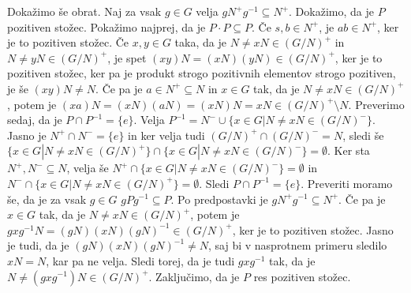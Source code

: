 \documentclass[a4paper, 12pt]{article}
\begin{document}
Dokažimo še obrat. Naj za vsak $g\in G$ velja $g N^+ g^{-1} \subseteq N^+$. Dokažimo, da je $P$ pozitiven stožec. Pokažimo najprej, da je $P\cdot P \subseteq P$. Če $s,b\in N^+$, je $ab \in N^+$, ker je to pozitiven stožec. Če $x,y\in G$ taka, da je $N\neq xN \in (G/N)^+$ in $N \neq yN \in (G/N)^+$, je spet $(xy)N = (xN) (yN)\in (G/N)^+$, ker je to pozitiven stožec, ker pa je produkt strogo pozitivnih elementov strogo pozitiven, je še $(xy)N \neq N$. Če pa je $a\in N^+\subseteq N$ in $x\in G$ tak, da je $N\neq xN \in (G/N)^+$, potem je $(xa)N = (xN) (aN) = (xN)N = xN\in (G/N)^+ \setminus N$. Preverimo sedaj, da je $P\cap P^{-1} = \{e\}$. Velja $P^{-1} = N^- \cup \{ x\in G| N \neq xN \in (G/N)^-\}$. Jasno je $N^+ \cap N^- = \{e\}$ in ker velja tudi $(G/N)^+ \cap (G/N)^- = N$, sledi še $\{x\in G| N \neq xN \in (G/N)^+\} \cap \{x\in G| N \neq xN \in (G/N)^-\} = \emptyset$. Ker sta $N^+, N^- \subseteq  N$, velja še $N^+ \cap \{x\in G|  N \neq xN \in (G/N)^-\} = \emptyset$ in $N^- \cap \{x\in G|  N \neq xN \in (G/N)^+\} = \emptyset$. Sledi $P\cap P^{-1} = \{e\}$. Preveriti moramo še, da je za vsak $g\in G$ $gPg^{-1} \subseteq P$. Po predpostavki je $gN^+ g^{-1} \subseteq N^+$. Če pa je $x\in G$ tak, da je $N\neq xN \in (G/N)^+$, potem je $gxg^{-1} N = (gN) (xN) (gN)^{-1} \in (G/N)^+$, ker je to pozitiven stožec. Jasno je tudi, da je $(gN)(xN)(gN)^{-1} \neq N$, saj bi v nasprotnem primeru sledilo $xN = N$, kar pa ne velja. Sledi torej, da je tudi $gxg^{-1}$ tak, da je $N\neq (gxg^{-1})N \in (G/N)^+$. Zaključimo, da je $P$ res pozitiven stožec.
\end{document}
